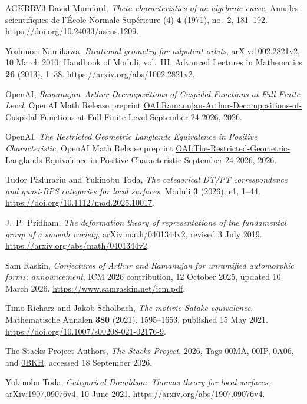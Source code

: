 \begin{thebibliography}{AGKRRV3}
David Mumford,
\emph{Theta characteristics of an algebraic curve},
Annales scientifiques de l'\'Ecole Normale Sup\'erieure (4)
\textbf{4} (1971), no.~2, 181--192.
\url{https://doi.org/10.24033/asens.1209}.

Yoshinori Namikawa,
\emph{Birational geometry for nilpotent orbits},
arXiv:1002.2821v2, 10 March 2010;
Handbook of Moduli, vol.~III, Advanced Lectures in Mathematics \textbf{26}
(2013), 1--38.
\url{https://arxiv.org/abs/1002.2821v2}.

OpenAI,
\emph{Ramanujan--Arthur Decompositions of Cuspidal Functions at Full Finite
Level},
OpenAI Math Release preprint
\href{https://github.com/openai/math/blob/main/preprints/Ramanujan-Arthur-Decompositions-of-Cuspidal-Functions-at-Full-Finite-Level-September-24-2026/paper.pdf}{OAI:Ramanujan-Arthur-Decompositions-of-Cuspidal-Functions-at-Full-Finite-Level-September-24-2026},
2026.

OpenAI,
\emph{The Restricted Geometric Langlands Equivalence in Positive
Characteristic},
OpenAI Math Release preprint
\href{https://github.com/openai/math/blob/main/preprints/The-Restricted-Geometric-Langlands-Equivalence-in-Positive-Characteristic-September-24-2026/paper.pdf}{OAI:The-Restricted-Geometric-Langlands-Equivalence-in-Positive-Characteristic-September-24-2026},
2026.

Tudor P\u{a}durariu and Yukinobu Toda,
\emph{The categorical DT/PT correspondence and quasi-BPS categories
for local surfaces},
Moduli \textbf{3} (2026), e1, 1--44.
\url{https://doi.org/10.1112/mod.2025.10017}.

J.~P.~Pridham,
\emph{The deformation theory of representations of the fundamental group
of a smooth variety},
arXiv:math/0401344v2, revised 3 July 2019.
\url{https://arxiv.org/abs/math/0401344v2}.

Sam Raskin,
\emph{Conjectures of Arthur and Ramanujan for unramified automorphic
forms: announcement},
ICM 2026 contribution, 12 October 2025, updated 10 March 2026.
\url{https://www.samraskin.net/icm.pdf}.

Timo Richarz and Jakob Scholbach,
\emph{The motivic Satake equivalence},
Mathematische Annalen \textbf{380} (2021), 1595--1653,
published 15 May 2021.
\url{https://doi.org/10.1007/s00208-021-02176-9}.

The Stacks Project Authors,
\emph{The Stacks Project}, 2026, Tags
\href{https://stacks.math.columbia.edu/tag/00MA}{00MA},
\href{https://stacks.math.columbia.edu/tag/00IP}{00IP},
\href{https://stacks.math.columbia.edu/tag/0A06}{0A06}, and
\href{https://stacks.math.columbia.edu/tag/0BKH}{0BKH},
accessed 18 September 2026.

Yukinobu Toda,
\emph{Categorical Donaldson--Thomas theory for local surfaces},
arXiv:1907.09076v4, 10 June 2021.
\url{https://arxiv.org/abs/1907.09076v4}.

\end{thebibliography}
